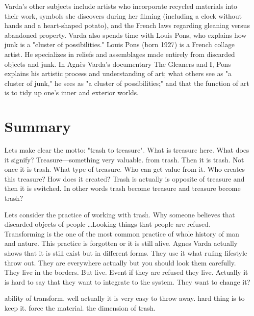 Varda's other subjects include artists who incorporate recycled materials into their work, symbols she discovers during her filming (including a clock without hands and a heart-shaped potato), and the French laws regarding gleaning versus abandoned property. Varda also spends time with Louis Pons, who explains how junk is a "cluster of possibilities." Louis Pons (born 1927) is a French collage artist. He specializes in reliefs and assemblages made entirely from discarded objects and junk. In Agnès Varda's documentary The Gleaners and I, Pons explains his artistic process and understanding of art; what others see as "a cluster of junk," he sees as "a cluster of possibilities;" and that the function of art is to tidy up one's inner and exterior worlds.






\section{Summary}



Lets make clear the motto: "trash to treasure". What is treasure here. What does it signify? Treasure---something very valuable. from trash. Then it is trash. Not once it is trash. What type of treasure. Who can get value from it. Who creates this treasure? How does it created? Trash is actually is opposite of treasure and then it is switched. In other words trash become treasure and treasure become trash?

Lets consider the practice of working with trash. Why someone believes that discarded objects of people \ldots Looking things that people are refused. Transforming is the one of the most common practice of whole history of man and nature. This practice is forgotten or it is still alive. Agnes Varda actually shows that it is still exist but in different forms. They use it what ruling lifestyle throw out. They are everywhere actually but you should look them carefully. They live in the borders. But live. Event if they are refused they live. Actually it is hard to say that they want to integrate to the system. They want to change it? 

ability of transform, well actually it is very easy to throw away. hard thing is to keep it. force the material. the dimension of trash.

